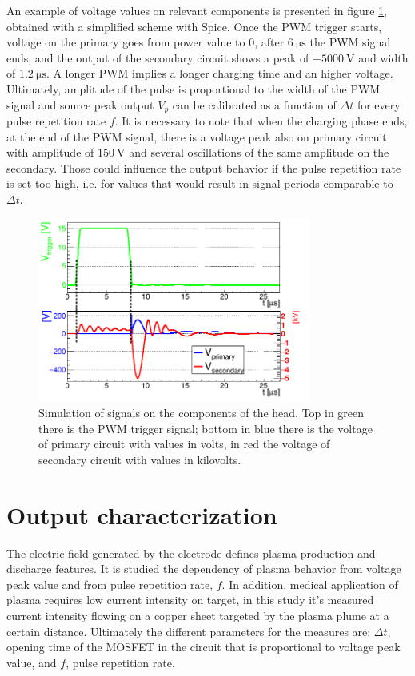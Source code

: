 An example of voltage values on relevant components is presented in figure \ref{fig:signals}, obtained with a simplified scheme with Spice. Once the PWM trigger starts, voltage on the primary goes from power value to $0$, after $\SI{6}{\micro\second}$ the PWM signal ends, and the output of the secondary circuit shows a peak of $\SI{-5000}{\volt}$ and width of $\SI{1.2}{\micro\second}$. A longer PWM implies a longer charging time and an higher voltage. Ultimately, amplitude of the pulse is proportional to the width of the PWM signal and source peak output $V_p$ can be calibrated as a function of $\Delta t$ for every pulse repetition rate $f$.
It is necessary to note that when the charging phase ends, at the end of the PWM signal, there is a voltage peak also on primary circuit with amplitude of $\SI{150}{\volt}$ and several oscillations of the same amplitude on the secondary. Those could influence the output behavior if the pulse repetition rate is set too high, i.e. for values that would result in signal periods comparable to $\Delta t$.
\begin{figure}
 \centering
 \includegraphics[width=0.8\textwidth]{Images/Electric/segnaliB2.png}
 \caption{Simulation of signals on the components of the head. Top in green there is the PWM trigger signal; bottom in blue there is the voltage of primary circuit with values in volts, in red the voltage of secondary circuit with values in kilovolts.}
 \label{fig:signals}
\end{figure}

\section{Output characterization}
The electric field generated by the electrode defines plasma production and discharge features. It is studied the dependency of plasma behavior from voltage peak value and from pulse repetition rate, $f$. In addition, medical application of plasma requires low current intensity on target, in this study it's measured current intensity flowing on a copper sheet targeted by the plasma plume at a certain distance. Ultimately the different parameters for the measures are: $\Delta t$, opening time of the MOSFET in the circuit that is proportional to voltage peak value, and $f$, pulse repetition rate. 

